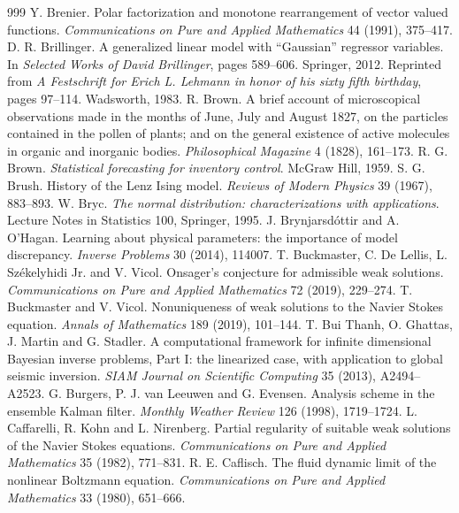 \begin{thebibliography}{999}
 Y. Brenier. Polar factorization and monotone rearrangement of vector valued functions. \emph{Communications on Pure and Applied Mathematics} 44 (1991), 375--417.
 D. R. Brillinger. A generalized linear model with ``Gaussian'' regressor variables. In \emph{Selected Works of David Brillinger}, pages 589--606. Springer, 2012. Reprinted from \emph{A Festschrift for Erich L. Lehmann in honor of his sixty fifth birthday}, pages 97--114. Wadsworth, 1983.
 R. Brown. A brief account of microscopical observations made in the months of June, July and August 1827, on the particles contained in the pollen of plants; and on the general existence of active molecules in organic and inorganic bodies. \emph{Philosophical Magazine} 4 (1828), 161--173.
 R. G. Brown. \emph{Statistical forecasting for inventory control}. McGraw Hill, 1959.
 S. G. Brush. History of the Lenz Ising model. \emph{Reviews of Modern Physics} 39 (1967), 883--893.
 W. Bryc. \emph{The normal distribution: characterizations with applications}. Lecture Notes in Statistics 100, Springer, 1995.
 J. Brynjarsd\'ottir and A. O'Hagan. Learning about physical parameters: the importance of model discrepancy. \emph{Inverse Problems} 30 (2014), 114007.
 T. Buckmaster, C. De Lellis, L. Sz\'ekelyhidi Jr. and V. Vicol. Onsager's conjecture for admissible weak solutions. \emph{Communications on Pure and Applied Mathematics} 72 (2019), 229--274.
 T. Buckmaster and V. Vicol. Nonuniqueness of weak solutions to the Navier Stokes equation. \emph{Annals of Mathematics} 189 (2019), 101--144.
 T. Bui Thanh, O. Ghattas, J. Martin and G. Stadler. A computational framework for infinite dimensional Bayesian inverse problems, Part I: the linearized case, with application to global seismic inversion. \emph{SIAM Journal on Scientific Computing} 35 (2013), A2494--A2523.
 G. Burgers, P. J. van Leeuwen and G. Evensen. Analysis scheme in the ensemble Kalman filter. \emph{Monthly Weather Review} 126 (1998), 1719--1724.
 L. Caffarelli, R. Kohn and L. Nirenberg. Partial regularity of suitable weak solutions of the Navier Stokes equations. \emph{Communications on Pure and Applied Mathematics} 35 (1982), 771--831.
 R. E. Caflisch. The fluid dynamic limit of the nonlinear Boltzmann equation. \emph{Communications on Pure and Applied Mathematics} 33 (1980), 651--666.

\end{thebibliography}
